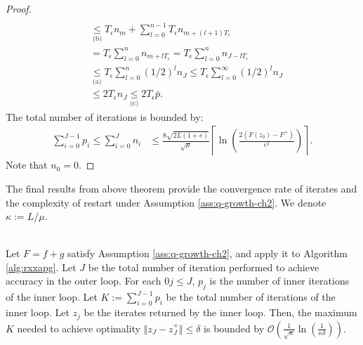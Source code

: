 \documentclass[12pt]{report}
\begin{document}
\begin{proof}
\begin{align*}
                \\
                &\underset{\text{(b)}}{\le} T_\epsilon n_m + \sum_{l = 0}^{n - 1} T_\epsilon n_{m + (l + 1)T_\epsilon}
                \\
                &= T_\epsilon \sum_{l = 0}^{n} n_{m + lT_\epsilon} = T_\epsilon \sum_{l = 0}^{n} n_{J - lT_\epsilon}
                \\
                &\underset{\text{(a)}}{\le} T_\epsilon \sum_{l = 0}^{n} (1/2)^l n_J \le T_\epsilon \sum_{l = 0}^{\infty} (1/2)^l n_J
                \\
                &\le 2T_\epsilon n_J \underset{\text{(c)}}{\le} 2T_\epsilon \bar p.
            \end{align*}
            The total number of iterations is bounded by: 
            \begin{align*}
                \sum_{i = 0}^{J - 1}p_i \le \sum_{i = 0}^{J} n_i &\le 
                \frac{8\sqrt{2L(1 + e)}}{\sqrt{\mu}} \left\lceil 
                \ln \left(
                    \frac{2(F(z_0) - F^+)}{\epsilon^2}
                \right) 
                \right\rceil. 
            \end{align*}
            Note that $n_0 = 0$. 
        \end{proof}
        \par
        The final results from above theorem provide the convergence rate of iterates and the complexity of restart \XXAPG{} under Assumption \ref{ass:q-growth-ch2}. 
        We denote $\kappa := L/\mu$. 
        \begin{theorem}\;\label{thm:rxxapg-cnvg-complexity}\\
            Let $F = f + g$ satisfy Assumption \ref{ass:q-growth-ch2}, and apply it to Algorithm \ref{alg:rxxapg}. 
            Let $J$ be the total number of iteration performed to achieve accuracy in the outer loop. 
            For each $0 j \le J$, $p_j$ is the number of inner iterations of the inner loop. 
            Let $K := \sum_{i = 0}^{J - 1}p_i$ be the total number of iterations of the inner loop. 
            Let $z_j$ be the iterates returned by the inner loop. 
            Then, the maximum $K$ needed to achieve optimality $\Vert z_J - z_J^+\Vert \le \delta$ is bounded by $\mathcal O\left(\frac{1}{\sqrt{\kappa}}\ln\left(\frac{1}{\kappa\delta}\right)\right)$. 
        \end{theorem}
\end{document}
